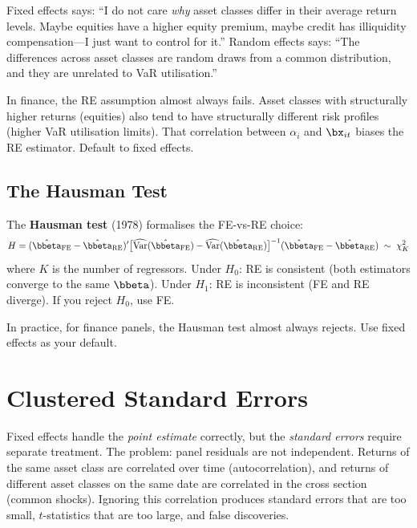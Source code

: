 \begin{intuition}
Fixed effects says: ``I do not care \emph{why} asset classes differ in their average return levels.
Maybe equities have a higher equity premium, maybe credit has illiquidity compensation---I just want to control for it.''
Random effects says: ``The differences across asset classes are random draws from a common distribution, and they are unrelated to VaR utilisation.''

In finance, the RE assumption almost always fails.
Asset classes with structurally higher returns (equities) also tend to have structurally different risk profiles (higher VaR utilisation limits).
That correlation between $\alpha_i$ and $\bx_{it}$ biases the RE estimator.
Default to fixed effects.
\end{intuition}

\subsection{The Hausman Test}

The \textbf{Hausman test} (1978) formalises the FE-vs-RE choice:
\begin{equation}
  H = (\hat{\bbeta}_{\text{FE}} - \hat{\bbeta}_{\text{RE}})' \bigl[\widehat{\operatorname{Var}}(\hat{\bbeta}_{\text{FE}}) - \widehat{\operatorname{Var}}(\hat{\bbeta}_{\text{RE}})\bigr]^{-1} (\hat{\bbeta}_{\text{FE}} - \hat{\bbeta}_{\text{RE}}) \;\sim\; \chi^2_K
  \label{eq:hausman}
\end{equation}
where $K$ is the number of regressors.
Under $H_0$: RE is consistent (both estimators converge to the same $\bbeta$).
Under $H_1$: RE is inconsistent (FE and RE diverge).
If you reject $H_0$, use FE.

In practice, for finance panels, the Hausman test almost always rejects.
Use fixed effects as your default.

\section{Clustered Standard Errors}
\label{sec:panel-cluster}

Fixed effects handle the \emph{point estimate} correctly, but the \emph{standard errors} require separate treatment.
The problem: panel residuals are not independent.
Returns of the same asset class are correlated over time (autocorrelation), and returns of different asset classes on the same date are correlated in the cross section (common shocks).
Ignoring this correlation produces standard errors that are too small, $t$-statistics that are too large, and false discoveries.

